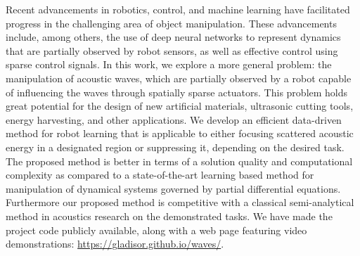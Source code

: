 Recent advancements in robotics, control, and machine learning have facilitated progress in the challenging area of object manipulation. These advancements include, among others, the use of deep neural networks to represent dynamics that are partially observed by robot sensors, as well as effective control using sparse control signals. In this work, we explore a more general problem: the manipulation of acoustic waves, which are partially observed by a robot capable of influencing the waves through spatially sparse actuators. This problem holds great potential for the design of new artificial materials, ultrasonic cutting tools, energy harvesting, and other applications. We develop an efficient data-driven method for robot learning that is applicable to either focusing scattered acoustic energy in a designated region or suppressing it, depending on the desired task. The proposed method is better in terms of a solution quality and computational complexity as compared to a state-of-the-art learning based method for manipulation of dynamical systems governed by partial differential equations. Furthermore our proposed method is competitive with a classical semi-analytical method in acoustics research on the demonstrated tasks. We have made the project code publicly available, along with a web page featuring video demonstrations: \url{https://gladisor.github.io/waves/}.



